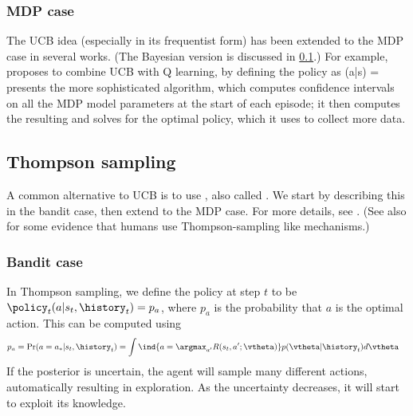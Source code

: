 \subsubsection{MDP case}

The UCB idea (especially in its frequentist form)
has been extended to the MDP case in several works.
(The Bayesian version is discussed in \cref{sec:thompson}.)
For example, \citep{Auer2002}
proposes to combine UCB with Q learning, by defining the policy as
\be
\pi(a|s) = 
\ee
\citep{Auer2008} presents the more sophisticated  algorithm,
which computes confidence intervals on all the MDP model
parameters at the start of each episode; it then computes the resulting
 and solves for the optimal policy,
which it uses to collect more data.



\subsection{Thompson sampling}
\label{sec:thompson}

A common alternative to UCB is to use
\citep{Thompson1933},
also called   \citep{Scott10}.
We start by describing this in the bandit case,
then extend to the MDP case.
For more details, see \citep{Russo2018}.
(See also \citep{Gershman2018} for some evidence that humans use
Thompson-sampling like mechanisms.)

\subsubsection{Bandit case}

In Thompson sampling,
we define the policy at step $t$ to be
$\policy_t(a|s_t,\history_t) = p_a$,
where $p_a$ is  the probability that $a$ is the optimal action.
This can be computed using
\begin{align}
p_a &= \Pr(a=a_*|s_t,\history_t)
  = \int \ind{a = \argmax_{a'} R(s_t,a';\vtheta)}
  p(\vtheta|\history_t) d\vtheta
  \label{eqn:bandit-probmatching}
\end{align}
If the posterior is uncertain, the agent will sample many different
actions, automatically resulting in exploration.
As the uncertainty decreases, it will start to exploit its knowledge.

